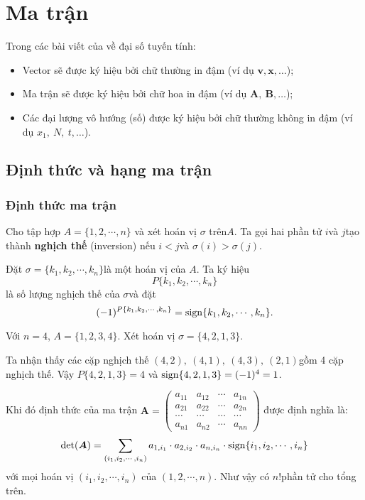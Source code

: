 \chapter{Ma trận}

Trong các bài viết của về đại số tuyến tính:

\begin{itemize}
    \item Vector sẽ được ký hiệu bởi chữ thường in đậm (ví dụ $\bm{v}, \bm{x}, \ldots$)​; 
    \item Ma trận sẽ được ký hiệu bởi chữ hoa in đậm (ví dụ $\bm{A},\ \bm{B}, \ldots$​);
    \item Các đại lượng vô hướng (số) được ký hiệu bởi chữ thường không in đậm (ví dụ $x_1,\ N,\ t, \ldots$).
\end{itemize}

\section{Định thức và hạng ma trận}

\subsection*{Định thức ma trận}

\begin{definition}
    Cho tập hợp $A = \{1, 2, \cdots, n\}$ và xét hoán vị $\sigma$ trên ​$A$. Ta gọi hai phần tử $i$​ và $j$​ tạo thành \textbf{nghịch thế} (inversion) nếu $i < j$​ và $\sigma(i) > \sigma(j)$.

    Đặt $\sigma = \{k_1, k_2, \cdots, k_n\}$​ là một hoán vị của $A$​. Ta ký hiệu \[ P\{k_1, k_2, \cdots, k_n\} \] là số lượng nghịch thế của $\sigma$​ và đặt \[ (-1)^{P\{k_1, k_2, \cdots, k_n\}} = \operatorname{sign} \{k_1, k_2, \cdots, k_n\}. \]
\end{definition}

\begin{example}
    Với $n=4$​, $A = \{1, 2, 3, 4\}$​. Xét hoán vị $\sigma = \{4, 2, 1, 3\}$.

    Ta nhận thấy các cặp nghịch thế $(4, 2),\ (4, 1),\ (4, 3),\ (2, 1)$​ gồm 4 cặp nghịch thế. Vậy $P\{4, 2, 1, 3\} = 4$ và $\operatorname{sign} \{4, 2, 1, 3\}=(-1)^4=1$​.
\end{example}

\begin{definition}
    Khi đó định thức của ma trận $\bm{A} = \begin{pmatrix}a_{11} & a_{12} & \cdots & a_{1n} \\ a_{21} & a_{22} & \cdots & a_{2n} \\ \cdots & \cdots & \cdots & \cdots \\ a_{n1} & a_{n2} & \cdots & a_{nn}\end{pmatrix}$ được định nghĩa là:
    \begin{equation}
        \det(\bm{A})=\displaystyle{\sum_{(i_1, i_2, \cdots, i_n)} a_{1, i_1} \cdot a_{2, i_2} \cdot a_{n, i_n} \cdot \operatorname{sign}\{i_1, i_2, \cdots, i_n\}}
    \end{equation}
    với mọi hoán vị $(i_1, i_2, \cdots, i_n)$ của $(1, 2, \cdots, n)$. Như vậy có $n!$​ phần tử cho tổng trên.
\end{definition}


